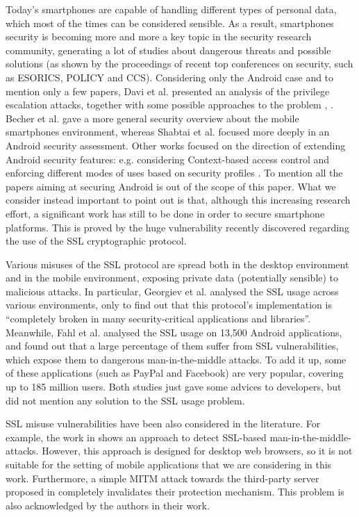 \documentclass[english]{llncs}
\begin{document}
Today's smartphones are capable of handling different types of personal data, which most of the times can be considered sensible. As a result, smartphones security is becoming more and more a key topic in the security research community, generating a lot of studies about dangerous threats and possible solutions (as shown by the proceedings of recent top conferences on security, such as ESORICS, POLICY and CCS). Considering only the Android case and to mention only a few papers, Davi et al. \cite{davi2011privilege} presented an analysis of the privilege escalation attacks, together with some possible approaches to the problem \cite{bugiel2011xmandroid}, \cite{bugiel2012towards}. Becher et al. \cite{5958024} gave a more general security overview about the mobile smartphones environment, whereas Shabtai et al. \cite{5396322} focused more deeply in an Android security assessment. Other works focused on the direction of extending Android security features: e.g. considering Context-based access control \cite{conti2011crepe} and enforcing different modes of uses based on security profiles \cite{russello2012moses}. To mention all the papers aiming at securing Android is out of the scope of this paper. What we consider instead important to point out is that, although this increasing research effort, a significant work has still to be done in order to secure smartphone platforms. This is proved by the huge vulnerability recently discovered regarding the use of the SSL cryptographic protocol.

Various misuses of the SSL protocol are spread both in the desktop environment and in the mobile environment, exposing private data (potentially sensible) to malicious attacks. In particular, Georgiev et al. \cite{Georgiev:2012:MDC:2382196.2382204} analysed the SSL usage across various environments, only to find out that this protocol's implementation is ``completely broken in many security-critical applications and libraries''. Meanwhile, Fahl et al. \cite{Fahl:2012:WEM:2382196.2382205} analysed the SSL usage on 13,500 Android applications, and found out that a large percentage of them suffer from SSL vulnerabilities, which expose them to dangerous man-in-the-middle attacks. To add it up, some of these applications (such as PayPal and Facebook) are very popular, covering up to 185 million users. Both studies just gave some advices to developers, but did not mention any solution to the SSL usage problem.

SSL misuse vulnerabilities have been also considered in the literature. For example, the work in \cite{Benton:2011:SPD:2179298.2179365} shows an approach to detect SSL-based man-in-the-middle-attacks. However, this approach is designed for desktop web browsers, so it is not suitable for the setting of mobile applications that we are considering in this work. Furthermore, a simple MITM attack towards the third-party server proposed in \cite{Benton:2011:SPD:2179298.2179365} completely invalidates their protection mechanism. This problem is also acknowledged by the authors in their work.
\end{document}
